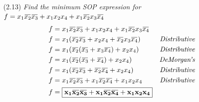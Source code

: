\documentclass[12pt]{article}
\newcommand{\overbar}[1]{\mkern 1.5mu\overline{\mkern-1.5mu#1\mkern-1.5mu}\mkern 1.5mu}
\begin{document}
\begin{enumerate}
\begin{enumerate}
    	\item[(2.13)] \textit{Find the minimum SOP expression for $f=x_1\overbar{x_2}\overbar{x_3} + x_1x_2x_4 + x_1\overbar{x_2}x_3\overbar{x_4}$}
    	\begin{align*}
    	f &= x_1\overbar{x_2}\overbar{x_3} + x_1x_2x_4 + x_1\overbar{x_2}x_3\overbar{x_4} \\
        f &= x_1(\overbar{x_2}\overbar{x_3} + x_2x_4 + \overbar{x_2}x_3\overbar{x_4}) & \textit{Distributive} \\
        f &= x_1(\overbar{x_2}(\overbar{x_3}+x_3\overbar{x_4}) + x_2x_4) & \textit{Distributive} \\
        f &= x_1(\overbar{x_2}(\overbar{x_3}+\overbar{x_4}) + x_2x_4) & \textit{DeMorgan's} \\
        f &= x_1(\overbar{x_2}\overbar{x_3}+\overbar{x_2}\overbar{x_4} + x_2x_4) & \textit{Distributive} \\
        f &= x_1\overbar{x_2}\overbar{x_3}+x_1\overbar{x_2}\overbar{x_4} + x_1x_2x_4 & \textit{Distributive} \\
        f &= \boxed{\mathbf{x_1\overbar{x_2}\overbar{x_3}+x_1\overbar{x_2}\overbar{x_4} + x_1x_2x_4}} \\
    	\end{align*}


\end{enumerate}
\end{enumerate}
\end{document}
